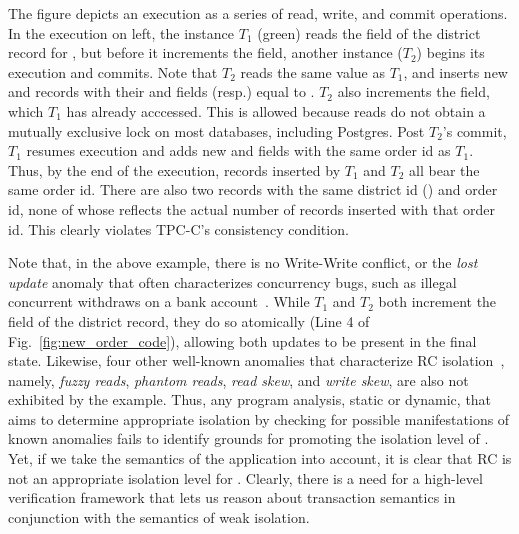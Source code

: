 The figure depicts an execution as a series of read, write, and commit
operations. In the execution on left, the  instance
$T_1$ (green) reads the  field of the district
record for , but before it increments the field, another
 instance ($T_2$) begins its execution and commits. Note
that $T_2$ reads the same  value as $T_1$, and
inserts new  and  records with their 
and  fields (resp.) equal to . $T_2$
also increments the  field, which $T_1$ has already
acccessed. This is allowed because reads do not obtain a mutually
exclusive lock on most databases, including Postgres. Post $T_2$'s
commit, $T_1$ resumes execution and adds new  and
 fields with the same order id as $T_1$. Thus, by the
end of the execution,  records inserted by $T_1$ and
$T_2$ all bear the same order id. There are also two  records
with the same district id () and order id, none of whose
 reflects the actual number of  records
inserted with that order id. This clearly violates TPC-C's consistency
condition.

Note that, in the above example, there is no Write-Write conflict, or
the \emph{lost update} anomaly that often characterizes concurrency
bugs, such as illegal concurrent withdraws on a bank
account~\cite{poloniexbug}. While $T_1$ and $T_2$ both increment the
 field of the district record, they do so atomically
(Line 4 of Fig.~\ref{fig:new_order_code}), allowing both updates to be
present in the final state. Likewise, four other well-known anomalies
that characterize RC isolation~\cite{berenson}, namely, \emph{fuzzy
reads}, \emph{phantom reads}, \emph{read skew}, and \emph{write skew},
are also not exhibited by the example. Thus, any program analysis,
static or dynamic, that aims to determine appropriate isolation by
checking for possible manifestations of known anomalies fails to
identify grounds for promoting the isolation level of .
Yet, if we take the semantics of the application into account, it is
clear that RC is not an appropriate isolation level for
. Clearly, there is a need for a high-level verification
framework that lets us reason about transaction semantics in
conjunction with the semantics of weak isolation.

